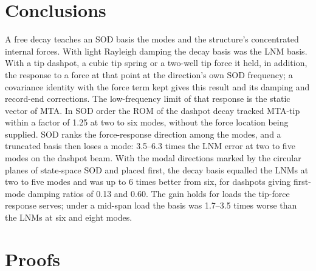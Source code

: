 \documentclass[preprint,12pt]{elsarticle}
\begin{document}
\section{Conclusions}\label{sec:concl}
A free decay teaches an SOD basis the modes and the structure's concentrated internal forces. With light Rayleigh damping the decay basis was the LNM basis. With a tip dashpot, a cubic tip spring or a two-well tip force it held, in addition, the response to a force at that point at the direction's own SOD frequency; a covariance identity with the force term kept gives this result and its damping and record-end corrections. The low-frequency limit of that response is the static vector of MTA. In SOD order the ROM of the dashpot decay tracked MTA-tip within a factor of 1.25 at two to six modes, without the force location being supplied.
SOD ranks the force-response direction among the modes, and a truncated basis then loses a mode: 3.5--6.3 times the LNM error at two to five modes on the dashpot beam. With the modal directions marked by the circular planes of state-space SOD and placed first, the decay basis equalled the LNMs at two to five modes and was up to 6 times better from six, for dashpots giving first-mode damping ratios of 0.13 and 0.60. The gain holds for loads the tip-force response serves; under a mid-span load the basis was 1.7--3.5 times worse than the LNMs at six and eight modes.


\appendix
\section{Proofs}\label{app:proofs}
\end{document}
